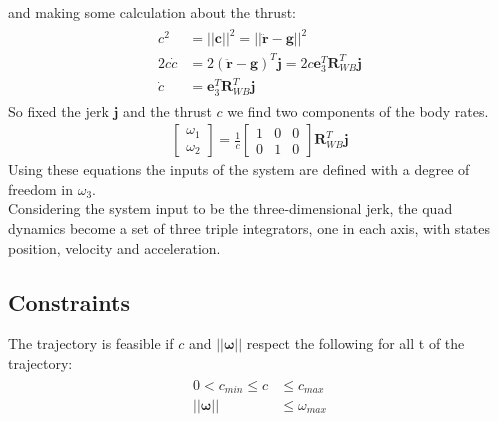 and making some calculation about the thrust:
\begin{align}
\begin{split}
c^2 &= ||\boldsymbol{c}||^2 =  ||\ddot{\boldsymbol{r}} - \boldsymbol{g}||^2 \\[10pt]
2c\dot{c} &= 2(\ddot{\boldsymbol{r}} - \boldsymbol{g})^T \boldsymbol{j} = 2 c\boldsymbol{e}_3^T\boldsymbol{R}_{WB}^T \boldsymbol{j}   \\[10pt]
\dot{c} &= \boldsymbol{e}_3^T\boldsymbol{R}_{WB}^T \boldsymbol{j} 
\end{split}
\end{align}
So fixed the jerk $\boldsymbol{j}$ and the thrust $c$ we find two components of the body rates.
\begin{align}
{\begin{bmatrix}
\omega_1 \\[10pt]
\omega_2
\end{bmatrix}}  = \frac{1}{c}
{\begin{bmatrix}
1 & 0 & 0  \\[10pt]
0 & 1 & 0
\end{bmatrix}}\boldsymbol{R}_{WB}^T \boldsymbol{j}
\end{align}
Using these equations the inputs of the system are defined with a degree of freedom in $\omega_3$.\\
Considering the system input to be the three-dimensional jerk, the quad dynamics become a set of three triple integrators, one in each axis, with states position, velocity and acceleration. 

\subsection{Constraints}
The trajectory is feasible if $c$ and $||\boldsymbol{\omega}||$ respect the following for all t of the trajectory:
\begin{align}
\begin{split}
0 < c_{min} \leq c &\leq c_{max}\\
||\boldsymbol{\omega}|| & \leq \omega_{max}
\end{split}
\end{align}


